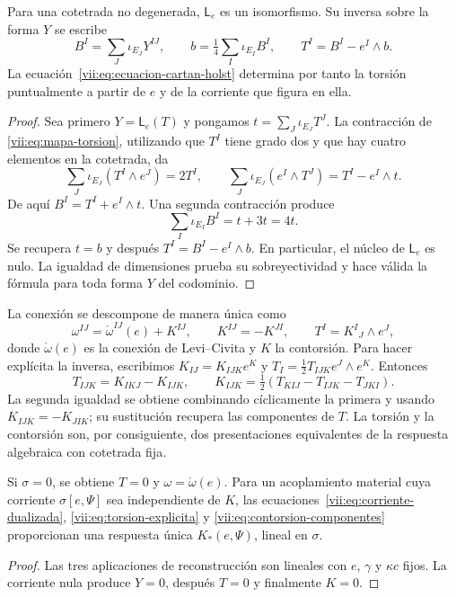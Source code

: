 \begin{theorem}
\label{vii:thm:inversion-torsion}
Para una cotetrada no degenerada, \(\mathsf L_e\) es un isomorfismo.
Su inversa sobre la forma \(Y\) se escribe
\begin{equation}
 B^I=\sum_J\iota_{E_J}Y^{IJ},\qquad
 b=\tfrac14\sum_I\iota_{E_I}B^I,\qquad
 T^I=B^I-e^I\wedge b.
 \label{vii:eq:torsion-explicita}
\end{equation}
La ecuación~\eqref{vii:eq:ecuacion-cartan-holst} determina por tanto
la torsión puntualmente a partir de \(e\) y de la corriente que figura
en ella.
\end{theorem}
\begin{proof}
Sea primero \(Y=\mathsf L_e(T)\) y pongamos
\(t=\sum_J\iota_{E_J}T^J\). La contracción de
\eqref{vii:eq:mapa-torsion}, utilizando que \(T^I\) tiene grado dos
y que hay cuatro elementos en la cotetrada, da
\[
 \sum_J\iota_{E_J}(T^I\wedge e^J)=2T^I,
 \qquad
 \sum_J\iota_{E_J}(e^I\wedge T^J)=T^I-e^I\wedge t.
\]
De aquí \(B^I=T^I+e^I\wedge t\). Una segunda contracción produce
\[
 \sum_I\iota_{E_I}B^I=t+3t=4t.
\]
Se recupera \(t=b\) y después \(T^I=B^I-e^I\wedge b\).
En particular, el núcleo de \(\mathsf L_e\) es nulo. La igualdad
de dimensiones prueba su sobreyectividad y hace válida la fórmula
para toda forma \(Y\) del codominio.
\end{proof}

La conexión se descompone de manera única como
\begin{equation}
 \omega^{IJ}=\mathring\omega^{IJ}(e)+K^{IJ},\qquad
 K^{IJ}=-K^{JI},\qquad T^I=K^I{}_{J}\wedge e^J,
 \label{vii:eq:contorsion}
\end{equation}
donde \(\mathring\omega(e)\) es la conexión de Levi--Civita y
\(K\) la contorsión. Para hacer explícita la inversa, escribimos
\(K_{IJ}=K_{IJK}e^K\) y
\(T_I=\tfrac12T_{IJK}e^J\wedge e^K\). Entonces
\begin{equation}
 T_{IJK}=K_{IKJ}-K_{IJK},\qquad
 K_{IJK}=\tfrac12(T_{KIJ}-T_{IJK}-T_{JKI}).
 \label{vii:eq:contorsion-componentes}
\end{equation}
La segunda igualdad se obtiene combinando cíclicamente la primera y
usando \(K_{IJK}=-K_{JIK}\); su sustitución recupera las componentes
de \(T\). La torsión y la contorsión son, por consiguiente, dos
presentaciones equivalentes de la respuesta algebraica con cotetrada fija.

\begin{corollary}
\label{vii:cor:desacoplamiento-torsional}
Si \(\sigma=0\), se obtiene \(T=0\) y
\(\omega=\mathring\omega(e)\). Para un acoplamiento material cuya
corriente \(\sigma[e,\Psi]\) sea independiente de \(K\),
las ecuaciones~\eqref{vii:eq:corriente-dualizada},
\eqref{vii:eq:torsion-explicita} y
\eqref{vii:eq:contorsion-componentes} proporcionan una respuesta única
\(K_*(e,\Psi)\), lineal en \(\sigma\).
\end{corollary}
\begin{proof}
Las tres aplicaciones de reconstrucción son lineales con \(e\),
\(\gamma\) y \(\kappa c\) fijos. La corriente nula produce
\(Y=0\), después \(T=0\) y finalmente \(K=0\).
\end{proof}

